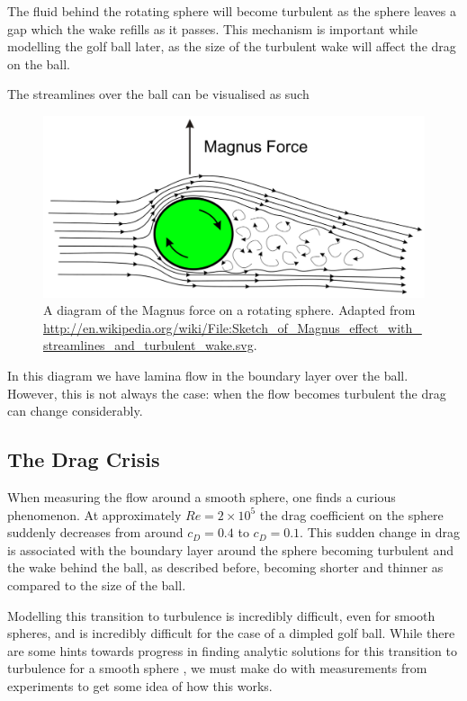 The fluid behind the rotating sphere will become turbulent as the sphere leaves a gap which the wake
refills as it passes. This mechanism is important while modelling the golf ball later, as the size
of the turbulent wake will affect the drag on the ball.

The streamlines over the ball can be visualised as such
\begin{figure}[h]
\centering
\includegraphics[scale=0.45]{../images/magnus.pdf}
\caption[A diagram of the Magnus effect]{A diagram of the Magnus force on a rotating sphere.
Adapted from \url{http://en.wikipedia.org/wiki/File:Sketch_of_Magnus_effect_with_streamlines_and_turbulent_wake.svg}.}
\end{figure}

In this diagram we have lamina flow in the boundary layer over the ball. However, this is not always
the case: when the flow becomes turbulent the drag can change considerably.

\subsection{The Drag Crisis} \label{sec:drag-crisis}

When measuring the flow around a smooth sphere, one finds a curious phenomenon. At approximately
$Re = 2\times10^5$ the drag coefficient on the sphere suddenly decreases from around $c_D = 0.4$ 
to $c_D = 0.1$. This sudden change in drag is associated with the boundary layer around the sphere
becoming turbulent and the wake behind the ball, as described before, becoming shorter and thinner as
compared to the size of the ball.

Modelling this transition to turbulence is incredibly difficult, even for smooth spheres, and is 
incredibly difficult for the case of a dimpled golf ball. While there are some hints towards progress 
in finding analytic solutions for this transition to turbulence for a smooth sphere 
\citet{Assis2010Analytical},
we must make do with measurements from experiments to get some idea of how this works.

